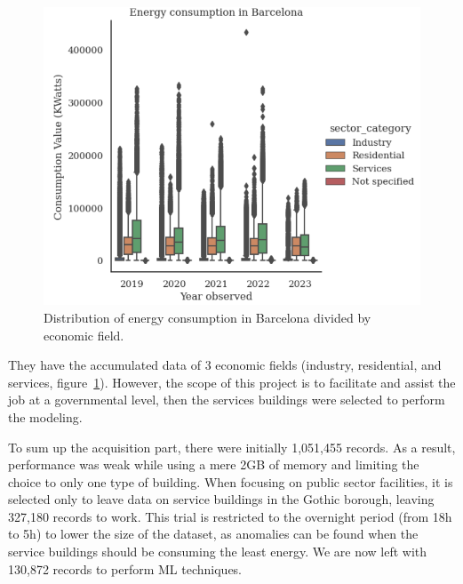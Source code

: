 \documentclass[a4paper,12pt,twoside]{ThesisStyle}
\begin{document}
\begin{figure}[hbt]
\centering
\includegraphics[width=13 cm]{imatges/energy_bcn_2019_2023-2.png}
\caption{\label{fig:energy_bcn_2019_2023} Distribution of energy consumption in Barcelona divided by economic field.}
\end{figure}

They have the accumulated data of 3 economic fields (industry, residential, and services, figure~\ref{fig:energy_bcn_2019_2023}). However, the scope of this project is to facilitate and assist the job at a governmental level, then the services buildings were selected to perform the modeling. 

To sum up the acquisition part, there were initially 1,051,455 records. As a result, performance was weak while using a mere 2GB of memory and limiting the choice to only one type of building. When focusing on public sector facilities, it is selected only to leave data on service buildings in the Gothic borough, leaving  327,180 records to work. This trial is restricted to the overnight period (from 18h to 5h) to lower the size of the dataset, as anomalies can be found when the service buildings should be consuming the least energy. We are now left with 130,872 records to perform ML techniques.
\end{document}
